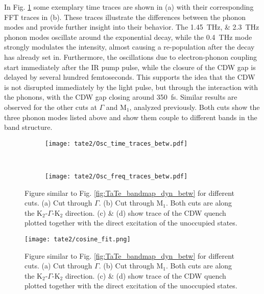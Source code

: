 In Fig. \ref{fig:TaTe_FFT_traces_betw} some exemplary time traces are shown in (a) with their corresponding FFT traces in (b).
These traces illustrate the differences between the phonon modes and provide further insight into their behavior.
The \qtylist{1.45; 2.3}{\tera\hertz} phonon modes oscillate around the exponential decay, while the \qty{0.4}{\tera\hertz} mode strongly modulates the intensity, almost causing a re-population after the decay has already set in.
Furthermore, the oscillations due to electron-phonon coupling start immediately after the IR pump pulse, while the closure of the CDW gap is delayed by several hundred femtoseconds.
This supports the idea that the CDW is not disrupted immediately by the light pulse, but through the interaction with the phonons, with the CDW gap closing around \qty{350}{\femto\second}.
Similar results are observed for the other cuts at $\Gamma$ and M$_1$, analyzed previously.
Both cuts show the three phonon modes listed above and show them couple to different bands in the band structure.

\begin{figure}[t!]
	\centering
	\begin{subfigure}[b]{\textwidth}
		\texttt{[image: tate2/Osc\_time\_traces\_betw.pdf]}
		\caption{}
	\end{subfigure}
	\\
	\begin{subfigure}[b]{\textwidth}
		\texttt{[image: tate2/Osc\_freq\_traces\_betw.pdf]}
		\caption{}
	\end{subfigure}
	\caption{Figure similar to Fig. \ref{fig:TaTe_bandmap_dyn_betw} for different cuts. (a) Cut through $\Gamma$. (b) Cut through M$_1$. Both cuts are along the K$_2$-$\Gamma$-K$_2$ direction. (c) \& (d) show trace of the CDW quench plotted together with the direct excitation of the unoccupied states.}
	\label{fig:TaTe_FFT_traces_betw}
\end{figure}

\begin{figure}[b!]
	\centering
	\texttt{[image: tate2/cosine\_fit.png]}
	\caption{Figure similar to Fig. \ref{fig:TaTe_bandmap_dyn_betw} for different cuts. (a) Cut through $\Gamma$. (b) Cut through M$_1$. Both cuts are along the K$_2$-$\Gamma$-K$_2$ direction. (c) \& (d) show trace of the CDW quench plotted together with the direct excitation of the unoccupied states.}
	\label{fig:TaTe_cosine}
\end{figure}


